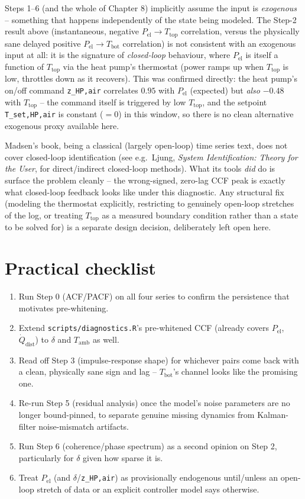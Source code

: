 \documentclass[11pt]{article}
\begin{document}
Steps 1--6 (and the whole of Chapter 8) implicitly assume the input is
\emph{exogenous} -- something that happens independently of the state being
modeled. The Step-2 result above (instantaneous, negative
$P_{\text{el}} \to T_{\text{top}}$ correlation, versus the physically sane
delayed positive $P_{\text{el}} \to T_{\text{bot}}$ correlation) is not
consistent with an exogenous input at all: it is the signature of
\emph{closed-loop} behaviour, where $P_{\text{el}}$ is itself a function of
$T_{\text{top}}$ via the heat pump's thermostat (power ramps up when
$T_{\text{top}}$ is low, throttles down as it recovers). This was confirmed
directly: the heat pump's on/off command \texttt{z\_HP,air} correlates
$0.95$ with $P_{\text{el}}$ (expected) but \emph{also} $-0.48$ with
$T_{\text{top}}$ -- the command itself is triggered by low $T_{\text{top}}$,
and the setpoint \texttt{T\_set,HP,air} is constant ($=0$) in this window, so
there is no clean alternative exogenous proxy available here.

Madsen's book, being a classical (largely open-loop) time series text, does
not cover closed-loop identification (see e.g.\ Ljung, \emph{System
Identification: Theory for the User}, for direct/indirect closed-loop
methods). What its tools \emph{did} do is surface the problem cleanly --
the wrong-signed, zero-lag CCF peak is exactly what closed-loop feedback
looks like under this diagnostic. Any structural fix (modeling the
thermostat explicitly, restricting to genuinely open-loop stretches of the
log, or treating $T_{\text{top}}$ as a measured boundary condition rather
than a state to be solved for) is a separate design decision, deliberately
left open here.

\section{Practical checklist}

\begin{enumerate}
\item Run Step 0 (ACF/PACF) on all four series to confirm the persistence
  that motivates pre-whitening.
\item Extend \texttt{scripts/diagnostics.R}'s pre-whitened CCF (already
  covers $P_{\text{el}}$, $\dot Q_{\text{dist}}$) to $\delta$ and
  $T_{\text{amb}}$ as well.
\item Read off Step 3 (impulse-response shape) for whichever pairs come back
  with a clean, physically sane sign and lag -- $T_{\text{bot}}$'s channel
  looks like the promising one.
\item Re-run Step 5 (residual analysis) once the model's noise parameters
  are no longer bound-pinned, to separate genuine missing dynamics from
  Kalman-filter noise-mismatch artifacts.
\item Run Step 6 (coherence/phase spectrum) as a second opinion on Step 2,
  particularly for $\delta$ given how sparse it is.
\item Treat $P_{\text{el}}$ (and $\delta$/\texttt{z\_HP,air}) as
  provisionally endogenous until/unless an open-loop stretch of data or an
  explicit controller model says otherwise.
\end{enumerate}
\end{document}
